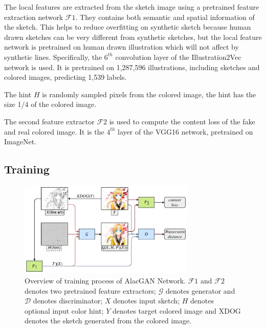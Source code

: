 The local features are extracted from the sketch image using a pretrained feature extraction network $\mathcal{F}1$. They contains both semantic and spatial information of the sketch. This helps to reduce overfitting on synthetic sketch because human drawn sketches can be very different from synthetic sketches, but the local feature network is pretrained on human drawn illustration which will not affect by synthetic lines. Specifically, the $6^{th}$ convolution layer of the Illustration2Vec\cite{saitoIllustration2VecSemanticVector2015} network is used. It is pretrained on 1,287,596 illustrations, including sketches and colored images, predicting 1,539 labels.

The hint $H$ is randomly sampled pixels from the colored image, the hint has the size 1/4 of the colored image.

The second feature extractor $\mathcal{F}2$ is used to compute the content loss of the fake and real colored image. It is the $4^{th}$ layer of the VGG16 network, pretrained on ImageNet\cite{ImageNet}.

\subsection{Training}


\begin{figure}
    \centering
    \includegraphics[width=0.75\textwidth]{images/colorization/alacgan_train.png}
    \caption{Overview of training process of AlacGAN Network. $\mathcal{F}1$ and $\mathcal{F}2$ denotes two pretrained feature extractors; $\mathcal{G}$ denotes generator and $\mathcal{D}$ denotes discriminator; $X$ denotes input sketch; $H$ denotes optional input color hint; $Y$ denotes target colored image and XDOG denotes the sketch generated from the colored image.} 
    \label{fig:alacgan_train}
\end{figure}

